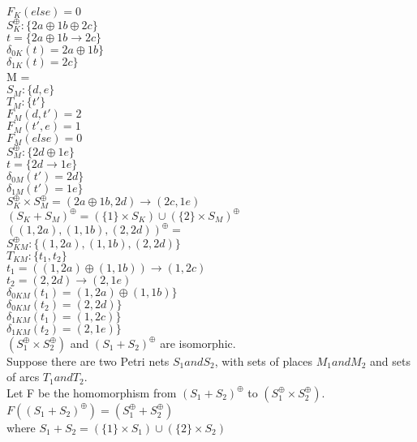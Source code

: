 $F_K (else) = 0$\\
%
$S_K^\oplus :\{ 2a \oplus 1b \oplus 2c\}$\\
$t = \{ 2a \oplus 1b \rightarrow 2c \}$\\  
$\delta_{0K} (t) = 2a \oplus 1b \}$\\
$\delta_{1K} (t) = 2c \}$\\
\smallskip
M = \\
$S_M :\{d,e\}$\\
$T_M :\{t'\}$\\  
$F_M (d, t') = 2$\\
$F_M (t', e) = 1$\\
$F_M (else) = 0$\\
%
$S_M^\oplus :\{ 2d \oplus 1e\}$\\
$t = \{ 2d \rightarrow 1e \}$\\  
$\delta_{0M} (t') = 2d \}$\\
$\delta_{1M} (t') = 1e \}$\\
\smallskip
$S_K^\oplus \times S_M^\oplus = (2a \oplus 1b, 2d) \rightarrow (2c, 1e)$\\
\smallskip
$(S_K + S_M)^\oplus = (\{1\} \times S_K) \cup (\{2\} \times S_M)^\oplus$\\
$((1, 2a), (1, 1b), (2, 2d))^\oplus = $\\
$S_{KM}^\oplus: \{(1, 2a), (1, 1b), (2, 2d) \}$\\
$T_{KM}: \{t_1, t_2\}$\\
$t_1 = ((1, 2a) \oplus (1, 1b)) \rightarrow (1, 2c)$\\
$t_2 = (2, 2d) \rightarrow (2, 1e)$\\
$\delta_{0KM} (t_1) = (1, 2a) \oplus (1, 1b) \}$\\
$\delta_{0KM} (t_2) = (2, 2d) \}$\\
$\delta_{1KM} (t_1) = (1, 2c) \}$\\
$\delta_{1KM} (t_2) = (2, 1e) \}$\\
\smallskip
$(S_1 ^\oplus \times S_2 ^\oplus)$ and $(S_1 + S_2)^\oplus$ are isomorphic. \\
Suppose there are two Petri nets $S_1 and S_2$, with sets of places $M_1 and M_2$ and sets of arcs $T_1 and T_2.$\\
Let F be the homomorphism from $(S_1 + S_2)^\oplus$ to $(S_1 ^\oplus \times S_2 ^\oplus)$. \\
$F((S_1 + S_2)^\oplus) = (S_1 ^\oplus + S_2 ^\oplus)$\\
where $S_1 + S_2 = (\{1\} \times S_1) \cup (\{2\} \times S_2)$\\
